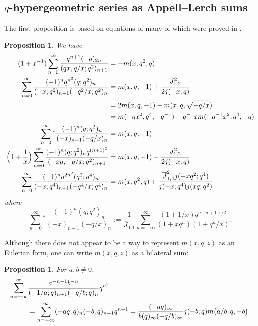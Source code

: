 \documentclass[12pt,reqno]{amsart}
\newtheorem{proposition}[theorem]{Proposition}
\theoremstyle{remark}
\theoremstyle{definition}
\numberwithin{theorem}{section} \numberwithin{equation}{section}
\numberwithin{example}{section}
\begin{document}
\subsection{$q$-hypergeometric series as Appell--Lerch sums}
The first proposition is based on equations of \cite{RLN} many of which were proved in \cite{AM}.
\begin{proposition}\label{proposition:eulerian-mxqz-prop} We have
{\allowdisplaybreaks \begin{align}
(1+x^{-1})\sum_{n= 0}^{\infty}\frac{q^{n+1}(-q)_{2n}}{(qx,q/x;q^2)_{n+1}}&=-m(x,q^2,q)\label{equation:RLNid1}\\
\sum_{n= 0}^{\infty}\frac{(-1)^nq^{n^2}(q;q^2)_{n}}{(-x;q^2)_{n+1}(-q^2/x;q^2)_{n}}&=m(x,q,-1)+\frac{J_{1,2}^2}{2j(-x;q)}\label{equation:RLNid2}\\
&=2m(x,q,-1)-m(x,q,\sqrt{-q/x}) \notag \\
& =m(-qx^2,q^4,-q^{-1})-q^{-1}xm(-q^{-1}x^2,q^4,-q)\notag\\
\sum_{n= 0}^{\infty}{}^{\ast}\frac{(-1)^n(q;q^2)_n}{(-x)_{n+1}(-q/x)_n}&=m(x,q,-1)\label{equation:RLNid3}\\
\Big ( 1+\frac{1}{x}\Big )\sum_{n=0}^{\infty}\frac{(-1)^n(q;q^2)_nq^{(n+1)^2}}{(-xq,-q/x;q^2)_{n+1}}&=m(x,q,-1)-\frac{J_{1,2}^2}{2j(-x;q)}\label{equation:RLNid4}\\
\sum_{n= 0}^{\infty}\frac{(-1)^nq^{2n^2}(q^2;q^4)_{n}}{(-x;q^4)_{n+1}(-q^4/x;q^4)_{n}}&=m(x,q^2,q)+\frac{\overline{J}_{1,4}^2j(-xq^2;q^4)}{j(-x;q^4)j(xq;q^2)}\label{equation:RLNid5}
\end{align}}where \cite[Entry $12.3.3$]{ABI}
\begin{equation}
\sum_{n= 0}^{\infty}{}^{\ast}\frac{(-1)^n(q;q^2)_n}{(-x)_{n+1}(-q/x)_n}
:=\frac{1}{\overline{J}_{0,1}}\sum_{n=-\infty}^{\infty}\frac{(1+1/x)q^{n(n+1)/2}}{(1+xq^n)(1+q^n/x)}.\label{equation:sumstar-def}
\end{equation}
\end{proposition}
Although there does not appear to be a way to represent $m(x,q,z)$ as an Eulerian form, one can write $m(x,q,z)$ as a bilateral sum:
\begin{proposition}\label{proposition:bilateral-mxqz-prop} For $a,b\ne 0$,
\begin{align}
\sum_{n=-\infty}^{\infty}&\frac{a^{-n-1}b^{-n}}{(-1/a;q)_{n+1}(-q/b;q)_n}q^{n^2}\\
&=\sum_{n=-\infty}^{\infty}(-aq;q)_{n}(-b;q)_{n+1}q^{n+1}=\frac{(-aq)_{\infty}}{b(q)_{\infty}(-q/b)_{\infty}}j(-b;q)m\big ( a/b,q,-b\big ).\notag
\end{align}
\end{proposition}
\end{document}

